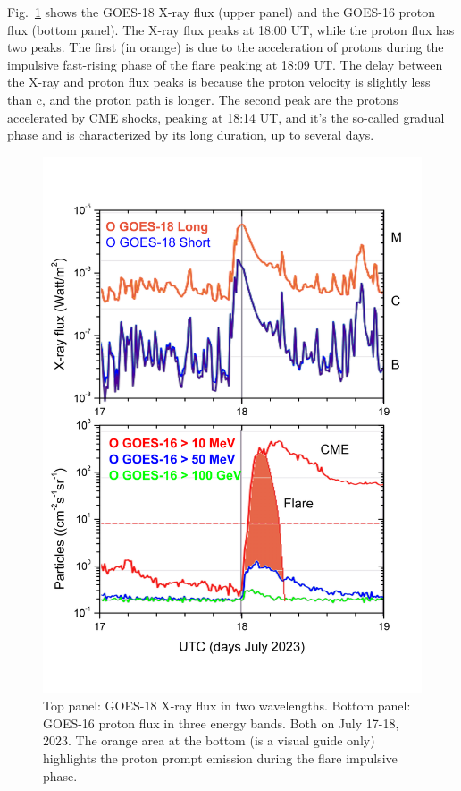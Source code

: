 \documentclass[twocolumn]{aastex63}
\begin{document}
Fig.~\ref{goes_goes} shows the GOES-18 X-ray flux (upper panel) and the GOES-16 proton flux (bottom panel). The X-ray flux peaks at 18:00 UT, while the proton flux has two peaks. The first (in orange) is due to the acceleration of protons during the impulsive fast-rising phase of the flare peaking at 18:09 UT. The delay between the X-ray and proton flux peaks is because the proton velocity is slightly less than c, and the proton path is longer. The second peak are the protons accelerated by CME shocks, peaking at 18:14 UT, and it's the so-called gradual phase and is characterized by its long duration, up to several days.


\begin{figure}[]
\vspace*{-1.0cm}
\hspace*{-0.5cm}
\centering
\includegraphics[clip,width=0.5
\textwidth,height=0.4\textheight,angle=0.] {Fig3.png}
\vspace*{-0.5cm}
\caption{Top panel: GOES-18 X-ray flux in two wavelengths.
Bottom panel: GOES-16 proton flux in three energy bands. Both on July 17-18, 2023. The orange area at the bottom (is a visual guide only) highlights the proton prompt emission during the flare impulsive phase.
}
\label{goes_goes}
\end{figure} 
\end{document}
